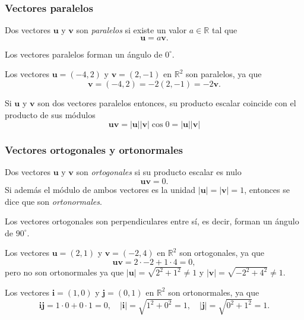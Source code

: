 \begin{frame}
\frametitle{Vectores paralelos}
\begin{definicion}
Dos vectores $\mathbf{u}$ y $\mathbf{v}$ son \emph{paralelos} si existe un valor $a\in\mathbb{R}$ tal que
\[
\mathbf{u} = a\mathbf{v}.
\]
\end{definicion}

Los vectores paralelos forman un ángulo de $0^\circ$.

Los vectores $\mathbf{u}=(-4,2)$ y $\mathbf{v}=(2,-1)$ en $\mathbb{R}^2$ son paralelos, ya que
\[
\mathbf{v}= (-4,2) = -2(2,-1) = -2\mathbf{v}.
\]

Si $\mathbf{u}$ y $\mathbf{v}$ son dos vectores paralelos entonces, su producto escalar coincide con el producto de sus módulos
\[
\mathbf{u}\mathbf{v} = |\mathbf{u}||\mathbf{v}|\cos 0 = |\mathbf{u}||\mathbf{v}|
\]
\end{frame} 


\begin{frame}
\frametitle{Vectores ortogonales y ortonormales}
\begin{definicion}
Dos vectores $\mathbf{u}$ y $\mathbf{v}$ son \emph{ortogonales} si su producto escalar es nulo
\[
\mathbf{u}\mathbf{v} = 0.
\]
Si además el módulo de ambos vectores es la unidad $|\mathbf{u}|=|\mathbf{v}|=1$, entonces se dice que son \emph{ortonormales}.
\end{definicion}

Los vectores ortogonales son perpendiculares entre sí, es decir, forman un ángulo de $90^\circ$.

Los vectores $\mathbf{u}=(2,1)$ y $\mathbf{v}=(-2,4)$ en $\mathbb{R}^2$ son ortogonales, ya que
\[
\mathbf{u}\mathbf{v} = 2\cdot -2 +1\cdot 4 = 0,
\]
pero no son ortonormales ya que $|\mathbf{u}| = \sqrt{2^2+1^2} \neq 1$ y  $|\mathbf{v}| = \sqrt{-2^2+4^2} \neq 1$.

Los vectores $\mathbf{i}=(1,0)$ y $\mathbf{j}=(0,1)$ en $\mathbb{R}^2$ son ortonormales, ya que
\[
\mathbf{i}\mathbf{j} = 1\cdot 0 +0\cdot 1 = 0, \quad |\mathbf{i}| = \sqrt{1^2+0^2} = 1,  \quad |\mathbf j| = \sqrt{0^2+1^2} = 1.
\]
\end{frame}  



